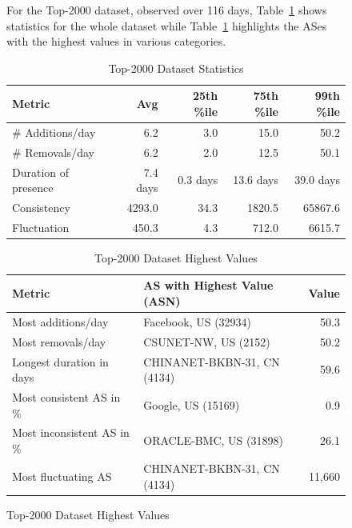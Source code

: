 \documentclass[12pt]{cwru_thesis}
\begin{document}
\begin{figure}[h!]
For the Top-2000 dataset, observed over 116 days, Table~\ref{tab:top-2000-stats} shows statistics for the whole dataset while Table~\ref{tab:top-2000-highest} highlights the ASes with the highest values in various categories.

\begin{table}[h!]
    \centering
    \begin{tabular}{|l|r|r|r|r|}
        \hline
        \textbf{Metric} & \textbf{Avg} & \textbf{25th \%ile} & \textbf{75th \%ile} & \textbf{99th \%ile} \\
        \hline
        \# Additions/day & 6.2 & 3.0 & 15.0 & 50.2 \\
        \hline
        \# Removals/day & 6.2 & 2.0 & 12.5 & 50.1 \\
        \hline
        Duration of presence & 7.4 days & 0.3 days & 13.6 days & 39.0 days \\
        \hline
        Consistency & 4293.0 & 34.3 & 1820.5 & 65867.6 \\
        \hline
        Fluctuation & 450.3 & 4.3 & 712.0 & 6615.7 \\
        \hline
    \end{tabular}
    \caption{Top-2000 Dataset Statistics}
    \label{tab:top-2000-stats}
\end{table}


\begin{table}[h!]
    \centering
    \begin{tabular}{|l|l|r|}
        \hline
        \textbf{Metric} & \textbf{AS with Highest Value (ASN)} & \textbf{Value} \\
        \hline
        Most additions/day & Facebook, US (32934) & 50.3 \\
        \hline
        Most removals/day & CSUNET-NW, US (2152) & 50.2 \\
        \hline
        Longest duration in days & CHINANET-BKBN-31, CN (4134) & 59.6 \\
        \hline
        Most consistent AS in \% & Google, US (15169) & 0.9 \\
        \hline
        Most inconsistent AS in \% & ORACLE-BMC, US (31898) & 26.1 \\
        \hline
        Most fluctuating AS & CHINANET-BKBN-31, CN (4134) & 11,660 \\
        \hline
    \end{tabular}
    \caption{Top-2000 Dataset Highest Values}
    \label{tab:top-2000-highest}
\end{table} 


\end{figure}
\end{document}
